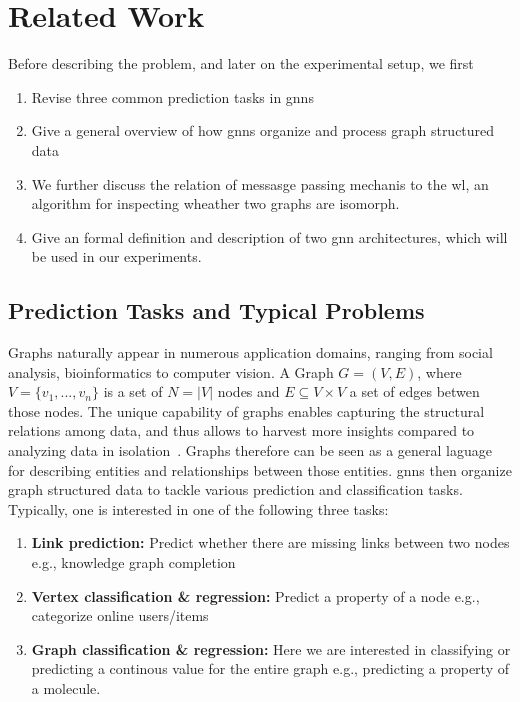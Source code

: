 %
\chapter{Related Work}
\label{sec:related}

Before describing the problem, and later on the experimental setup, we first
\begin{enumerate}
    \item Revise three common prediction tasks in \acp{gnn}
    \item Give a general overview of how \acp{gnn} organize and process graph structured data
    \item We further discuss the relation of messasge passing mechanis to the \ac{wl}, an algorithm for
          inspecting wheather two graphs are isomorph.
    \item Give an formal definition and description of two \ac{gnn}
          architectures, which will be used in our experiments.
\end{enumerate}


\section{Prediction Tasks and Typical Problems}
\label{sec:related:pred}

Graphs naturally appear in numerous application domains, ranging from social analysis,
bioinformatics to computer vision.
A Graph $G = (V,E)$, where $V = \{v_{1},...,v_{n}\}$ is a set of $N =|V|$ nodes and
$E \subseteq V\times V$ a set of edges betwen those nodes. The unique capability of
graphs enables capturing the structural relations among data, and thus allows to harvest more
insights compared to analyzing data in isolation~\cite{Zhang19}. Graphs therefore can be
seen as a general laguage for describing entities and relationships between those entities.
\Acfp{gnn} then organize graph structured data to tackle various prediction and classification
tasks. Typically, one is interested in one of the following three tasks:
\begin{enumerate}[label=\textbf{\arabic*.}]
    \item \textbf{Link prediction:}
          Predict whether there are missing links between two nodes
          e.g., knowledge graph completion

    \item \textbf{Vertex classification \& regression:}
          Predict a property of a node e.g., categorize online users/items

    \item \textbf{Graph classification \& regression:}
          Here we are interested in classifying or predicting a continous value for
          the entire graph e.g., predicting a property of a molecule.
\end{enumerate}


